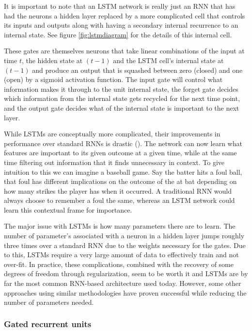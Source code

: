 \documentclass[]{book}
\theoremstyle{definition}
\theoremstyle{definition}
\theoremstyle{definition}
\theoremstyle{remark}
\begin{document}
It is important to note that an LSTM network is really just an RNN that
has had the neurons a hidden layer replaced by a more complicated cell
that controls its inputs and outputs along with having a secondary
internal recurrence to an internal state. See figure
\ref{fig:lstmdiagram} for the details of this internal cell.

These gates are themselves neurons that take linear combinations of the
input at time \(t\), the hidden state at \((t - 1)\) and the LSTM cell's
internal state at \((t - 1)\) and produce an output that is squashed
between zero (closed) and one (open) by a sigmoid activation function.
The input gate will control what information makes it through to the
unit internal state, the forget gate decides which information from the
internal state gets recycled for the next time point, and the output
gate decides what of the internal state is important to the next layer.

While LSTMs are conceptually more complicated, their improvements in
performance over standard RNNs is drastic (\citet{lstm_intro}). The
network can now learn what features are important to its given outcome
at a given time, while at the same time filtering out information that
it finds unnecessary in context. To give intuition to this we can
imagine a baseball game. Say the batter hits a foul ball, that foul has
different implications on the outcome of the at bat depending on how
many strikes the player has when it occurred. A traditional RNN would
always choose to remember a foul the same, whereas an LSTM network could
learn this contextual frame for importance.

The major issue with LSTMs is how many parameters there are to learn.
The number of parameter's associated with a neuron in a hidden layer
jumps roughly three times over a standard RNN due to the weights
necessary for the gates. Due to this, LSTMs require a very large amount
of data to effectively train and not over-fit. In practice, these
complications, combined with the recovery of some degrees of freedom
through regularization, seem to be worth it and LSTMs are by far the
most common RNN-based architecture used today. However, some other
approaches using similar methodologies have proven successful while
reducing the number of parameters needed.

\subsubsection{Gated recurrent units}\label{gated-recurrent-units}
\end{document}
